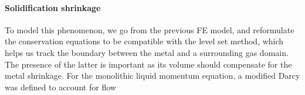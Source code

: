 \paragraph{Solidification shrinkage}
To model this phenomenon, we go from the previous FE model, and reformulate the conservation equations to be compatible with the level set method,
which helps us track the boundary between the metal and a surrounding gas domain. The presence of the latter is important as its volume should compensate
for the metal shrinkage. For the monolithic liquid momentum equation, a modified Darcy was defined to account for flow 


